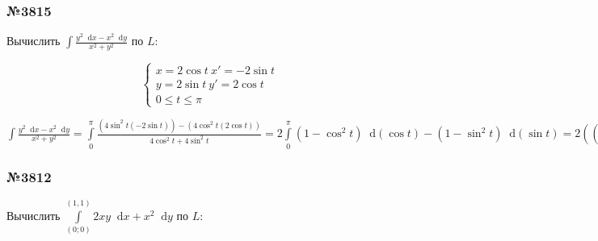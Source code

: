 \documentclass{article}
\newcommand*\diff{\mathop{}\!\mathrm{d}}
\begin{document}
\subsubsection{№3815}

Вычислить $\int \frac{y^2 \diff x - x^2 \diff y}{x^2 + y^2}$ по $L$:

\begin{equation}
    \begin{cases}
        x = 2 \cos t \ x' = - 2 \sin t \\
        y = 2 \sin t \ y' = 2 \cos t \\
        0 \le t \le \pi
    \end{cases}
\end{equation}

$\int \frac{y^2 \diff x - x^2 \diff y}{x^2 + y^2} = \int\limits_{0}^{\pi} \frac{(4 \sin^2 t (-2 \sin t)) - (4 \cos^2 t (2 \cos t))}{4 \cos^2 t + 4 \sin^2 t} = 2 \int\limits_{0}^{\pi} (1 - \cos^2 t) \diff (\cos t) - (1 - \sin^2 t) \diff (\sin t) = 2 ((\cos t - \frac{\cos^3 t}{3}) - (\sin t - \frac{\sin^3 t}{3})) \bigg|_{0}^{\pi} = 2 (-1 + \frac{1}{3} - 0 + 0 - (1 - \frac{1}{3} - 0 + 0)) = 2 (-\frac{2}{3} - \frac{2}{3}) = 2(-\frac{4}{3}) = -\frac{8}{3}$

\subsubsection{№3812}

Вычислить $\int\limits_{(0; 0)}^{(1,1)} 2xy \diff x + x^2 \diff y$ по $L$:
\end{document}
